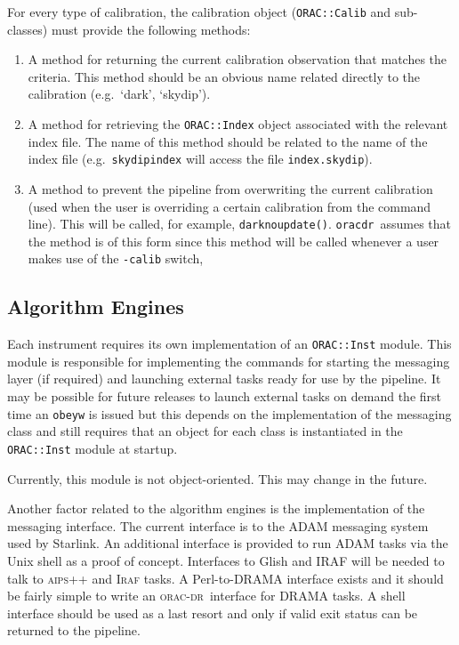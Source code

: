 \documentclass[twoside,11pt]{article}
\renewcommand{\_}{\texttt{\symbol{95}}}
\newcommand{\Oracdr}{\textsc{orac-dr}}
\newcommand{\oracdr}{\texttt{oracdr}}
\begin{document}
For every type of calibration, the calibration object
(\texttt{ORAC::Calib} and sub-classes) must provide the following methods:
\begin{enumerate}
\item A method for returning the current calibration observation that
matches the criteria. This method should be an obvious name related
directly to the calibration (e.g.\ `dark', `skydip').
\item A method for retrieving the \texttt{ORAC::Index} object
associated with the relevant index file. The name of this method
should be related to the name of the index file (e.g.\
\texttt{skydipindex} will access the file \texttt{index.skydip}).
\item A method to prevent the pipeline from overwriting the current
calibration (used when the user is overriding a certain calibration
from the command line). This will be called, for example,
\texttt{darknoupdate()}. \oracdr\ assumes that the method
is of this form since this method will be called whenever a user
makes use of the \texttt{-calib} switch,

\end{enumerate}



\subsection{Algorithm Engines}

Each instrument requires its own implementation of an
\texttt{ORAC::Inst} module. This module is responsible for
implementing the commands for starting the messaging layer (if
required) and launching external tasks ready for use by the
pipeline. It may be possible for future releases to launch
external tasks on demand the first time an \texttt{obeyw} is
issued but this depends on the implementation of the messaging class and 
still requires that an object for each class is instantiated in the
\texttt{ORAC::Inst} module at startup.

Currently, this module is not object-oriented. This may change in the
future.

Another factor related to the algorithm engines is the implementation
of the messaging interface. The current interface is to the 
ADAM messaging system used by Starlink. An additional interface is
provided to run ADAM tasks via the Unix shell as a proof of concept.
Interfaces to Glish and IRAF will be needed to talk to \textsc{aips++}
and \textsc{Iraf} tasks. A Perl-to-DRAMA interface exists and it
should be fairly simple to write an \Oracdr\ interface for
DRAMA tasks. A shell interface should be used as a last
resort and only if valid exit status can be returned to the pipeline.
\end{document}
